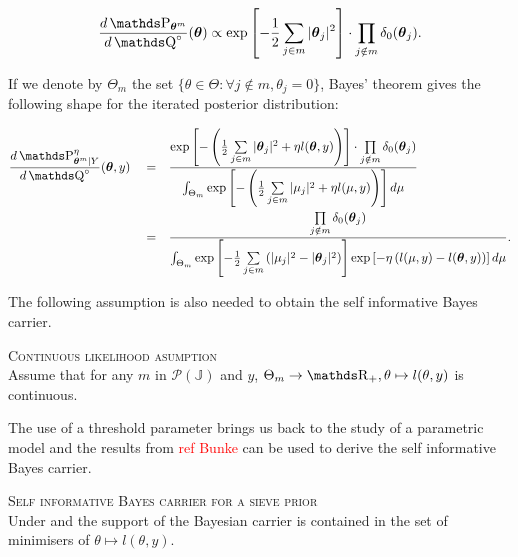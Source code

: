 \[\frac{d\P_{\boldsymbol{\theta}^{m}}}{d\Q^{\circ}}(\boldsymbol{\theta}) \propto  \exp\left[-\frac{1}{2}\sum\limits_{j \in m} \vert \boldsymbol{\theta}_{j} \vert^{2}\right] \cdot \prod\limits_{j \notin m} \delta_{0}(\boldsymbol{\theta}_{j}).\]

If we denote by $\Theta_{m}$ the set $\{\theta \in \Theta : \forall j \notin m, \theta_{j} = 0\}$, Bayes' theorem gives the following shape for the iterated posterior distribution:

\begin{alignat*}{3}
& \frac{d\P_{\boldsymbol{\theta}^{m}\vert Y}^{\eta}}{d\Q^{\circ}}(\boldsymbol{\theta}, y)&& = && \frac{\exp\left[-\left(\frac{1}{2}\sum\limits_{j \in m} \vert \boldsymbol{\theta}_{j} \vert^{2} + \eta l(\boldsymbol{\theta}, y)\right)\right] \cdot \prod\limits_{j \notin m} \delta_{0}(\boldsymbol{\theta}_{j})}{\int_{\Theta_{m}} \exp\left[-\left(\frac{1}{2}\sum\limits_{j \in m} \vert \mu_{j} \vert^{2} + \eta l(\mu, y)\right)\right] d\mu}\\
& && = && \frac{\prod\limits_{j \notin m} \delta_{0}(\boldsymbol{\theta}_{j})}{\int_{\Theta_{m}} \exp\left[-\frac{1}{2}\sum\limits_{j \in m} \left(\vert \mu_{j} \vert^{2} - \vert \boldsymbol{\theta}_{j} \vert^{2}\right)\right]\exp\left[-\eta\left(l(\mu, y) - l(\boldsymbol{\theta}, y)\right)\right] d\mu}.
\end{alignat*}

The following assumption is also needed to obtain the self informative Bayes carrier.

\begin{as}{\textsc{Continuous likelihood asumption}\\}\label{as2.1.2}
Assume that for any $m$ in $\mathcal{P}(\mathds{J})$ and $y$, $\Theta_{m} \rightarrow \R_{+}, \theta \mapsto l(\theta, y)$ is continuous.
\end{as}

The use of a threshold parameter brings us back to the study of a parametric model and the results from \textcolor{red}{ref Bunke} can be used to derive the self informative Bayes carrier.

\begin{thm}{\textsc{Self informative Bayes carrier for a sieve prior}\\}\label{thm2.1.1}
Under  and  the support of the Bayesian carrier is contained in the set of minimisers of $\theta \mapsto l(\theta, y)$.
\end{thm}

